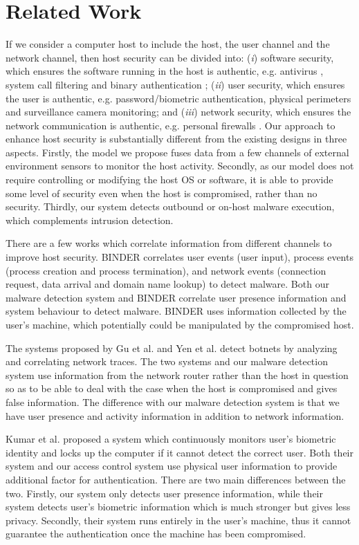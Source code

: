 \section{Related Work}
\label{sec:related}

If we consider a computer host to include the host, the user channel
and the network channel, then host security can be divided into:
({\it i}) software security, which ensures the software running in
the host is authentic, e.g. antivirus \cite{aveff}, system call
filtering \cite{systrace} and binary authentication \cite{binauth};
({\it ii}) user security, which ensures the user is authentic, e.g.
password/biometric authentication, physical perimeters and
surveillance camera monitoring; and ({\it iii}) network security,
which ensures the network communication is authentic, e.g. personal
firewalls \cite{firewallsurvey}. Our approach to enhance host
security is substantially different from the existing designs in
three aspects. Firstly, the model we propose fuses data from a few
channels of external environment sensors to monitor the host
activity. Secondly, as our model does not require controlling or
modifying the host OS or software, it is able to provide some
level of security even when the host is compromised, rather than no security. 
Thirdly, our system
detects outbound or on-host malware execution, which complements
intrusion detection.

There are a few works which correlate information from different
channels to improve host security. BIND\-ER \cite{binder}
correlates user events (user input), process even\-ts (process
creation and process termination), and network events (connection
request, data arrival and domain name lookup) to detect malware.
Both our malware detection system and BINDER correlate user presence
information and system behaviour to detect malware. BINDER uses
information collected by the user's machine, which potentially could
be manipulated by the compromised host.

The systems proposed by Gu et al. \cite{bothunter} and Yen et al.
\cite{trafagg} detect botnets by analyzing and correlating network
traces. The two systems and our malware detection system use
information from the network router rather than the host in question
so as to be able to deal with the case when the host is compromised
and gives false information. The difference with our malware
detection system is that we have user presence and activity
information in addition to network information.

Kumar et al. proposed a system 
\cite{biomon,biomon-win,biomon2} which continuously monitors
user's biometric identity and locks up the computer if it cannot detect
the correct user.
Both their system and our access control system use physical user
information to provide additional factor for authentication.
There are two main differences between the two.
Firstly, our system only detects user presence information, while
their system detects user's biometric information which is much
stronger but gives less privacy.
Secondly, their system runs entirely in the user's machine, thus
it cannot guarantee the authentication once the machine has been compromised.

